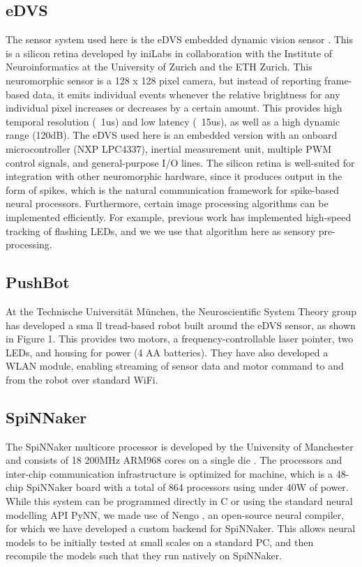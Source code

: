 \documentclass[conference]{IEEEtran}
\begin{document}
\subsection{eDVS}
The sensor system used here is the eDVS embedded dynamic vision sensor \cite{conradt2009embedded}. This is a silicon retina developed by iniLabs in collaboration with the Institute of Neuroinformatics at the University of Zurich and the ETH Zurich. This neuromorphic sensor is a 128 x 128 pixel camera, but instead of reporting frame-based data, it emits individual events whenever the relative brightness for any individual pixel increases or decreases by a certain amount. This provides high temporal resolution (~1us) and low latency (~15us), as well as a high dynamic range (120dB). The eDVS used here is an embedded version with an onboard microcontroller (NXP LPC4337), inertial measurement unit, multiple PWM control signals, and general-purpose I/O lines. The silicon retina is well-suited for integration with other neuromorphic hardware, since it produces output in the form of spikes, which is the natural communication framework for spike-based neural processors. Furthermore, certain image processing algorithms can be implemented efficiently. For example, previous work \cite{muller2011miniature} has implemented high-speed tracking of flashing LEDs, and we we use that algorithm here as sensory pre-processing.


\subsection{PushBot}
At the Technische Universit{\"a}t M{\"u}nchen, the Neuroscientific
System Theory group has developed a sma ll tread-based robot built around the eDVS sensor, as shown in Figure 1. This provides two motors, a frequency-controllable laser pointer, two LEDs, and housing for power (4 AA batteries). They have also developed a WLAN module, enabling
streaming of sensor data and motor command to and from the robot over standard WiFi.

\subsection{SpiNNaker}

The SpiNNaker multicore processor is developed by the University of Manchester and consists of 18 200MHz ARM968 cores on a single die \cite{furber2007neural, furber2014spinnaker}. The processors and inter-chip communication infrastructure is optimized for machine, which is a 48-chip SpiNNaker board with a total of 864 processors using under 40W of power. While this system can be programmed directly in C or using the standard neural modelling API PyNN, we made use of Nengo \cite{bekolay_nengo2014}, an open-source neural compiler, for which we have developed a custom backend for SpiNNaker. This allows neural models to be initially tested at small scales on a standard PC, and then recompile the models such that they
run natively on SpiNNaker.
\end{document}

